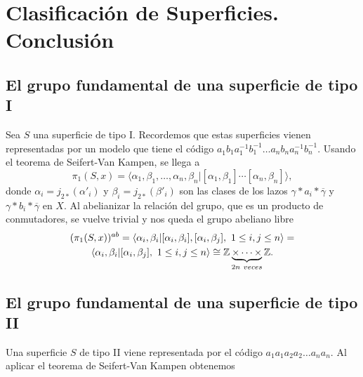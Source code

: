 \documentclass[GTSResumen.tex]{subfiles}
\begin{document}
\renewcommand\chaptername{\Huge Tema}

\titleformat{\chapter}[display]
    {\normalfont\huge\bfseries}{\chaptertitlename\ \thechapter}{10pt}{\Huge}
\titlespacing*{\chapter}{0pt}{-1cm}{10pt}





\setcounter{chapter}{5}

\chapter{Clasificación de Superficies.\\ Conclusión}

\section{El grupo fundamental de una superficie de tipo I}
Sea $S$ una superficie de tipo I. Recordemos que estas superficies vienen representadas por un modelo que tiene el código $a^{}_1b^{}_1a^{-1}_1b^{-1}_1\dots a^{}_nb^{}_na^{-1}_nb^{-1}_n$. Usando el teorema de Seifert-Van Kampen, se llega a 
\[
\pi_1(S,x)=\langle \alpha_1,\beta_1,\dots,\alpha_n,\beta_n|[\alpha_1,\beta_1]\cdots[\alpha_n,\beta_n]\rangle,
\]
donde $\alpha_i=j_{2*}(\alpha'_i)$ y $\beta_i=j_{2*}(\beta'_i)$ son las clases de los lazos  $\gamma*a_i*\overline{\gamma}$ y $\gamma*b_i*\overline{\gamma}$ en $X$. Al abelianizar la relación del grupo, que es un producto de conmutadores, se vuelve trivial y nos queda el grupo abeliano libre
\begin{gather*}
(\pi_1(S,x))^{ab}=\langle \alpha_i, \beta_i|[\alpha_i,\beta_i],[\alpha_i,\beta_j],\ 1\leq i, j\leq n\rangle=\\
\langle \alpha_i, \beta_i|[\alpha_i,\beta_j],\ 1\leq i, j\leq n\rangle\cong\mathbb{Z}\underbrace{\times\cdots\times}_{2n\ veces}\mathbb{Z}.
\end{gather*}


\section{El grupo fundamental de una superficie de tipo II}
Una superficie $S$ de tipo II viene representada por el código $a_1 a_1 a_2 a_2\dots a_n a_n$. Al aplicar el teorema de Seifert-Van Kampen obtenemos
\end{document}
